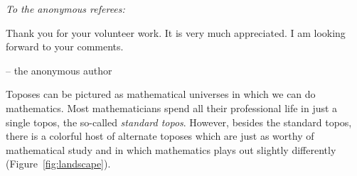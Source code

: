 \documentclass[oneside,reqno]{amsart}
\theoremstyle{definition}
\theoremstyle{plain}
\theoremstyle{remark}
\renewcommand{\_}{\mathpunct{.}\,}
\newcommand{\?}{\,{:}\,}
\begin{document}

\thispagestyle{empty}

\begin{center}
  \begin{minipage}{0.6\textwidth}
  \emph{To the anonymous referees:}
  \bigskip

  Thank you for your volunteer work. It is very much appreciated. I am looking
  forward to your comments.

  \hfill -- the anonymous author
  \end{minipage}
\end{center}
\bigskip

\noindent
Toposes can be pictured as mathematical universes in which we can do
mathematics. Most mathematicians spend all their professional life in just a
single topos, the so-called \emph{standard topos}. However, besides the
standard topos, there is a colorful host of alternate toposes which are just as
worthy of mathematical study and in which mathematics plays out slightly
differently (Figure~\ref{fig:landscape}).
\end{document}
